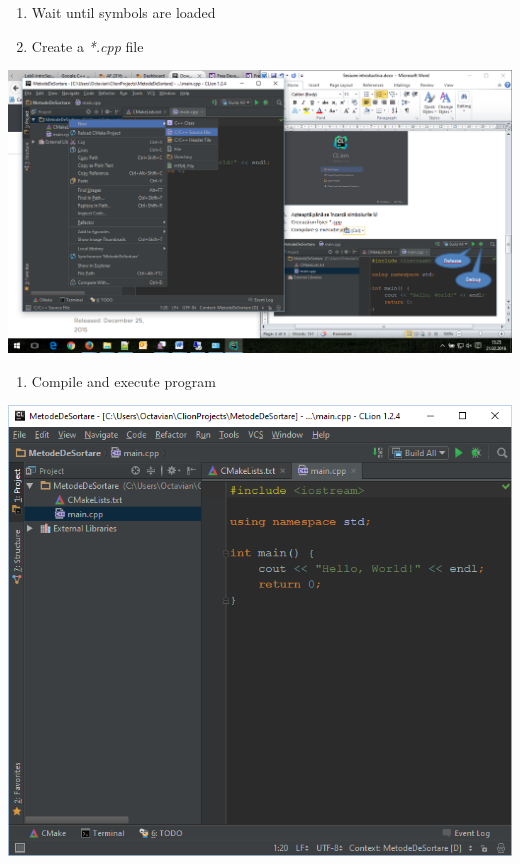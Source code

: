 \documentclass[../en-fa-lab.tex]{subfiles}
\begin{document}
\begin{enumerate}
\def\labelenumi{\arabic{enumi}.}
\setcounter{enumi}{1}
\item
  Wait until symbols are loaded
\item
  Create a \emph{*.cpp} file
\end{enumerate}

\includegraphics[width=\textwidth]{../Resources/lab0/image9.png}

\begin{enumerate}
\def\labelenumi{\arabic{enumi}.}
\setcounter{enumi}{3}
\item
  Compile and execute program
\end{enumerate}

\includegraphics[width=\textwidth]{../Resources/lab0/image10.png}
\end{document}
